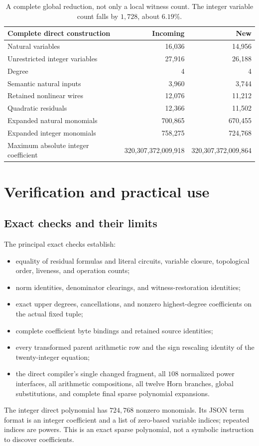 \documentclass[11pt,letterpaper]{article}
\theoremstyle{remark}\newtheorem{remark}[theorem]{Remark}
\begin{document}
\begin{table}[ht]
\centering\small
\begin{tabular}{@{}lrr@{}}
\toprule
Complete direct construction & Incoming & New\\
\midrule
Natural variables &16,036&14,956\\
Unrestricted integer variables &27,916&26,188\\
Degree &4&4\\
Semantic natural inputs &3,960&3,744\\
Retained nonlinear wires &12,076&11,212\\
Quadratic residuals &12,366&11,502\\
Expanded natural monomials &700,865&670,455\\
Expanded integer monomials &758,275&724,768\\
Maximum absolute integer coefficient &320,307,372,009,918&
320,307,372,009,864\\
\bottomrule
\end{tabular}
\caption{A complete global reduction, not only a local witness count.
The integer variable count falls by $1{,}728$, about $6.19\%$.}
\end{table}

\section{Verification and practical use}

\subsection{Exact checks and their limits}
The principal exact checks establish:
\begin{itemize}
\item equality of residual formulas and literal circuits, variable closure,
topological order, liveness, and operation counts;
\item norm identities, denominator clearings, and witness-restoration
identities;
\item exact upper degrees, cancellations, and nonzero highest-degree
coefficients on the actual fixed tuple;
\item complete coefficient byte bindings and retained source identities;
\item every transformed parent arithmetic row and the sign rescaling
identity of the twenty-integer equation;
\item the direct compiler's single changed fragment, all $108$ normalized
power interfaces, all arithmetic compositions, all twelve Horn branches,
global substitutions, and complete final sparse polynomial expansions.
\end{itemize}
The integer direct polynomial has $724{,}768$ nonzero monomials. Its
JSON term format is an integer coefficient and a list of zero-based variable
indices; repeated indices are powers. This is an exact sparse polynomial,
not a symbolic instruction to discover coefficients.
\end{document}
